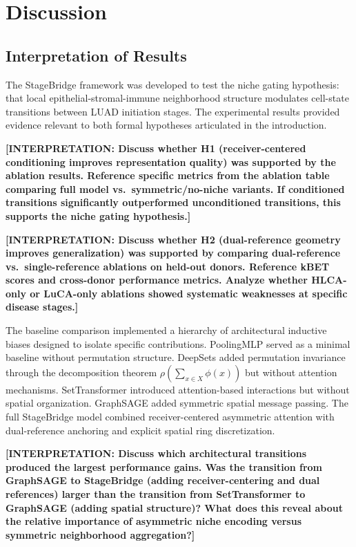\section{Discussion}

\subsection{Interpretation of Results}

The StageBridge framework was developed to test the niche gating hypothesis: that local epithelial-stromal-immune neighborhood structure modulates cell-state transitions between LUAD initiation stages. The experimental results provided evidence relevant to both formal hypotheses articulated in the introduction.

\textbf{[INTERPRETATION: Discuss whether H1 (receiver-centered conditioning improves representation quality) was supported by the ablation results. Reference specific metrics from the ablation table comparing full model vs.\ symmetric/no-niche variants. If conditioned transitions significantly outperformed unconditioned transitions, this supports the niche gating hypothesis.]}

\textbf{[INTERPRETATION: Discuss whether H2 (dual-reference geometry improves generalization) was supported by comparing dual-reference vs.\ single-reference ablations on held-out donors. Reference kBET scores and cross-donor performance metrics. Analyze whether HLCA-only or LuCA-only ablations showed systematic weaknesses at specific disease stages.]}

The baseline comparison implemented a hierarchy of architectural inductive biases designed to isolate specific contributions. PoolingMLP served as a minimal baseline without permutation structure. DeepSets added permutation invariance through the decomposition theorem $\rho(\sum_{x \in X} \phi(x))$ but without attention mechanisms. SetTransformer introduced attention-based interactions but without spatial organization. GraphSAGE added symmetric spatial message passing. The full StageBridge model combined receiver-centered asymmetric attention with dual-reference anchoring and explicit spatial ring discretization.

\textbf{[INTERPRETATION: Discuss which architectural transitions produced the largest performance gains. Was the transition from GraphSAGE to StageBridge (adding receiver-centering and dual references) larger than the transition from SetTransformer to GraphSAGE (adding spatial structure)? What does this reveal about the relative importance of asymmetric niche encoding versus symmetric neighborhood aggregation?]}

